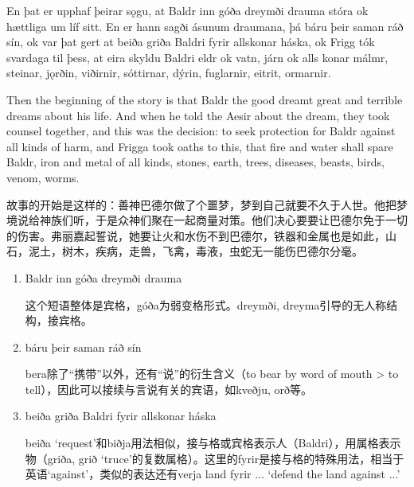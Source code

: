 \begin{paracol}{2}
  En þat er upphaf þeirar sǫgu, at Baldr inn góða dreymði drauma stóra ok hættliga um líf sitt. En er hann sagði ásunum draumana, þá báru þeir saman ráð sín, ok var þat gert at beiða griða Baldri fyrir allskonar háska, ok Frigg tók svardaga til þess, at eira skyldu Baldri eldr ok vatn, járn ok alls konar málmr, steinar, jǫrðin, viðirnir, sóttirnar, dýrin, fuglarnir, eitrit, ormarnir.

  \switchcolumn

  Then the beginning of the story is that Baldr the good dreamt great and terrible dreams about his life. And when he told the Aesir about the dream, they took counsel together, and this was the decision: to seek protection for Baldr against all kinds of harm, and Frigga took oaths to this, that fire and water shall spare Baldr, iron and metal of all kinds, stones, earth, trees, diseases, beasts, birds, venom, worms.
\end{paracol}
\begin{translation*}{}
  故事的开始是这样的：善神巴德尔做了个噩梦，梦到自己就要不久于人世。他把梦境说给神族们听，于是众神们聚在一起商量对策。他们决心要要让巴德尔免于一切的伤害。弗丽嘉起誓说，她要让火和水伤不到巴德尔，铁器和金属也是如此，山石，泥土，树木，疾病，走兽，飞禽，毒液，虫蛇无一能伤巴德尔分毫。
\end{translation*}
\begin{grammar*}{}
  \begin{enumerate}[leftmargin=*]
    \item Baldr inn góða dreymði drauma

          这个短语整体是宾格，góða为弱变格形式。dreymði, dreyma引导的无人称结构，接宾格。

    \item báru þeir saman ráð sín

          bera除了“携带”以外，还有“说”的衍生含义（to bear by word of mouth > to tell），因此可以接续与言说有关的宾语，如kveðju, orð等。

    \item beiða griða Baldri fyrir allskonar háska

          beiða `request'和biðja用法相似，接与格或宾格表示人（Baldri），用属格表示物（griða, grið `truce'的复数属格）。这里的fyrir是接与格的特殊用法，相当于英语`against'，类似的表达还有verja land fyrir ... `defend the land against ...'
  \end{enumerate}
\end{grammar*}

